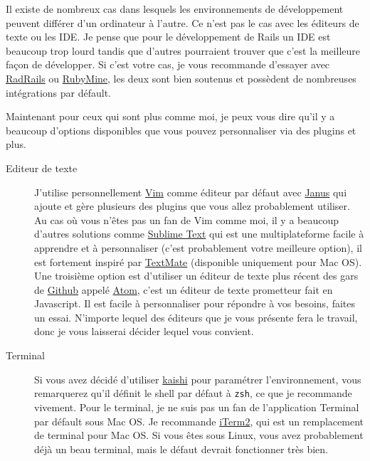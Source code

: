\documentclass[]{report}
\begin{document}
      Il existe de nombreux cas dans lesquels les environnements de développement peuvent différer d'un ordinateur à l'autre. Ce n'est pas le cas avec les éditeurs de texte ou les IDE. Je pense que pour le développement de Rails un IDE est beaucoup trop lourd tandis que d'autres pourraient trouver que c'est la meilleure façon de développer. Si c'est votre cas, je vous recommande d'essayer avec \href{http://www.aptana.com/products/radrails}{RadRails} ou \href{http://www.jetbrains.com/ruby/index.html}{RubyMine}, les deux sont bien soutenus et possèdent de nombreuses intégrations par défault.

      Maintenant pour ceux qui sont plus comme moi, je peux vous dire qu'il y a beaucoup d'options disponibles que vous pouvez personnaliser via des plugins et plus.

      \begin{description}
        \item[Editeur de texte] J'utilise personnellement \href{http://www.vim.org/}{Vim} comme éditeur par défaut avec \href{https://github.com/carlhuda/janus}{Janus} qui ajoute et gère plusieurs des plugins que vous allez probablement utiliser. Au cas où vous n'êtes pas un fan de Vim comme moi, il y a beaucoup d'autres solutions comme \href{http://www.sublimetext.com/}{Sublime Text} qui est une multiplateforme facile à apprendre et à personnaliser (c'est probablement votre meilleure option), il est fortement inspiré par \href{http://macromates.com/}{TextMate} (disponible uniquement pour Mac OS). Une troisième option est d'utiliser un éditeur de texte plus récent des gars de \href{http://gitub.com/}{Github} appelé \href{https://atom.io/}{Atom}, c'est un éditeur de texte prometteur fait en Javascript. Il est facile à personnaliser pour répondre à vos besoins, faites un essai. N'importe lequel des éditeurs que je vous présente fera le travail, donc je vous laisserai décider lequel vous convient.

        \item[Terminal] Si vous avez décidé d'utiliser \href{http://icalialabs.github.io/kaishi/}{kaishi} pour paramétrer l'environnement, vous remarquerez qu'il définit le shell par défaut à \verb|zsh|, ce que je recommande vivement. Pour le terminal, je ne suis pas un fan de l'application Terminal par défault sous Mac OS. Je recommande \href{http://www.iterm2.com/#/section/home}{iTerm2}, qui est un remplacement de terminal pour Mac OS. Si vous êtes sous Linux, vous avez probablement déjà un beau terminal, mais le défaut devrait fonctionner très bien.
      \end{description}
\end{document}
